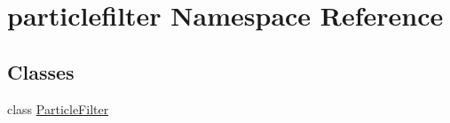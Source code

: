 \hypertarget{namespaceparticlefilter}{}\section{particlefilter Namespace Reference}
\label{namespaceparticlefilter}
\subsection*{Classes}
\begin{DoxyCompactItemize}
\item 
class \hyperlink{classparticlefilter_1_1ParticleFilter}{Particle\+Filter}
\end{DoxyCompactItemize}
